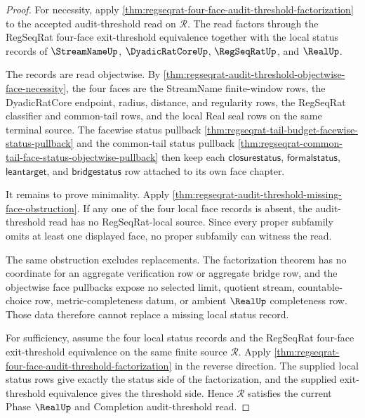 \begin{proof}
For necessity, apply \autoref{thm:regseqrat-four-face-audit-threshold-factorization} to the accepted audit-threshold read on $\mathcal R$. The read factors through the RegSeqRat four-face exit-threshold equivalence together with the local status records of $\StreamNameUp$, $\DyadicRatCoreUp$, $\RegSeqRatUp$, and $\RealUp$.

The records are read objectwise. By \autoref{thm:regseqrat-audit-threshold-objectwise-face-necessity}, the four faces are the StreamName finite-window rows, the DyadicRatCore endpoint, radius, distance, and regularity rows, the RegSeqRat classifier and common-tail rows, and the local Real seal rows on the same terminal source. The facewise status pullback \autoref{thm:regseqrat-tail-budget-facewise-status-pullback} and the common-tail status pullback \autoref{thm:regseqrat-common-tail-face-status-objectwise-pullback} then keep each $\mathsf{closurestatus}$, $\mathsf{formalstatus}$, $\mathsf{leantarget}$, and $\mathsf{bridgestatus}$ row attached to its own face chapter.

It remains to prove minimality. Apply \autoref{thm:regseqrat-audit-threshold-missing-face-obstruction}. If any one of the four local face records is absent, the audit-threshold read has no RegSeqRat-local source. Since every proper subfamily omits at least one displayed face, no proper subfamily can witness the read.

The same obstruction excludes replacements. The factorization theorem has no coordinate for an aggregate verification row or aggregate bridge row, and the objectwise face pullbacks expose no selected limit, quotient stream, countable-choice row, metric-completeness datum, or ambient $\RealUp$ completeness row. Those data therefore cannot replace a missing local status record.

For sufficiency, assume the four local status records and the RegSeqRat four-face exit-threshold equivalence on the same finite source $\mathcal R$. Apply \autoref{thm:regseqrat-four-face-audit-threshold-factorization} in the reverse direction. The supplied local status rows give exactly the status side of the factorization, and the supplied exit-threshold equivalence gives the threshold side. Hence $\mathcal R$ satisfies the current Phase $\RealUp$ and Completion audit-threshold read.
\end{proof}

